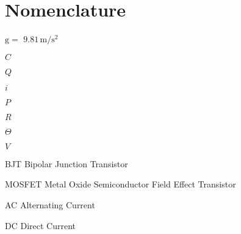 \chapter{Nomenclature}

\begin{Nomencl}
   \item[$\mathrm{g} = $] $\mathrm{9.81\,m/s^2}$

   \item[$C$] 
   \item[$Q$] 
   \item[$i$] 
   \item[$P$] 
   \item[$R$] 
   \item[$\Theta$] 
   \item[$V$] 

   \item[BJT] \quad\dotfill Bipolar Junction Transistor
   \item[MOSFET] \quad\dotfill Metal Oxide Semiconductor Field Effect Transistor
   \item[AC]  \quad\dotfill Alternating Current
   \item[DC]  \quad\dotfill Direct Current

\end{Nomencl}


\endinput
